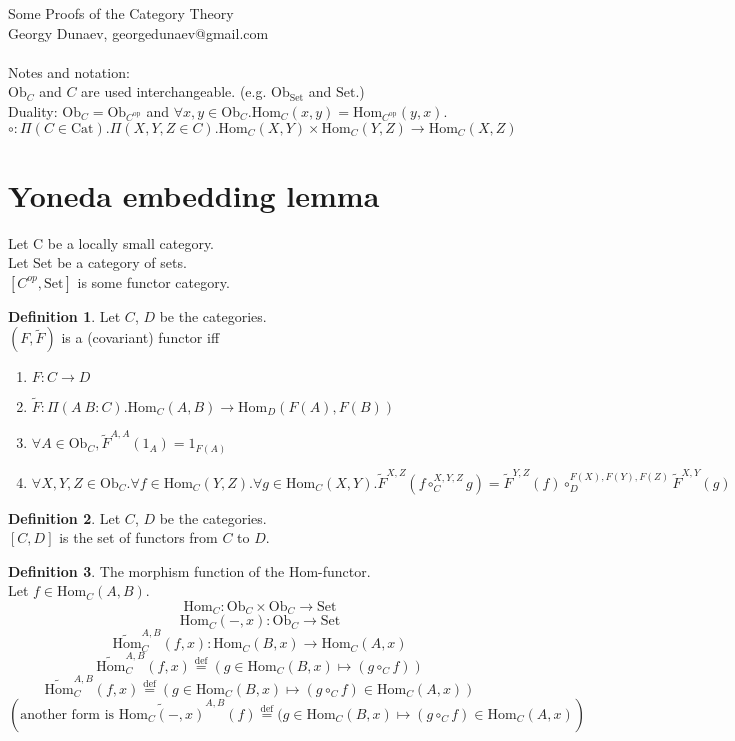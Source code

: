 \documentclass[10pt,a4paper]{article}
\theoremstyle{definition}
\newtheorem{definition}{Definition}[section]
\newcommand{\Ob}{{\mbox{Ob}}}
\newcommand{\Cat}{{\mbox{Cat}}}
\newcommand{\Hom}{{\mbox{Hom}}}
\newcommand{\HomMor}{{\widetilde{\Hom}\mbox{}}}
\newcommand{\FMor}{{\widetilde{F}\mbox{}}}
\newcommand{\op}{{\mbox{op}}}
\newcommand{\defi}{{\mbox{def}}}
\newcommand{\eqdef}{{\stackrel{\defi}{=}}}
\newcommand{\Set}{{\mbox{Set}}}
\begin{document}
Some Proofs of the Category Theory\\
Georgy Dunaev, georgedunaev@gmail.com\\
\\
Notes and notation:\\
$\Ob_C$ and $C$ are used interchangeable. (e.g. $\Ob_\Set$ and $\Set$.)\\
Duality: $\Ob_C = \Ob_{C^\op}$ and 
 $\forall x,y \in \Ob_C. \Hom_C(x,y) = \Hom_{C^\op}(y,x)$.\\
$\circ : \Pi(C\in \Cat).\Pi(X,Y,Z\in C).\Hom_C(X,Y)\times\Hom_C(Y,Z)\to\Hom_C(X,Z)$

\section{Yoneda embedding lemma}
Let C be a locally small category.\\
Let Set be a category of sets.\\
$[C^{op},\mbox{Set}]$ is some functor category.\\

\begin{definition}
Let $C$, $D$ be the categories.\\
 $(F, \FMor)$ is a (covariant) functor iff\\
\begin{enumerate}
\item $F:C \to D$
\item $\FMor:\Pi(A\ B:C).\Hom_C(A,B) \to \Hom_D(F(A), F(B))$
\item $\forall A\in \Ob_C, \FMor^{A,A}(1_A)=1_{F(A)}$
\item $\forall X,Y,Z \in \Ob_C.\forall f\in\Hom_C(Y,Z).\forall g\in\Hom_C(X,Y). \FMor^{X,Z}(f\circ_C^{X,Y,Z} g)=\FMor^{Y,Z}(f)\circ_D^{F(X),F(Y),F(Z)} \FMor^{X,Y}(g)$
\end{enumerate}

\end{definition}

\begin{definition}
Let $C$, $D$ be the categories.\\
$[C,D]$ is the set of functors from $C$ to $D$.\\
\end{definition}

\begin{definition} The morphism function of the Hom-functor.\\
Let $f\in\Hom_{C}(A,B)$.
$$\Hom_C: \Ob_C \times \Ob_C \to \Set$$
$$\Hom_C(-,x): \Ob_C \to \Set$$
$$\HomMor^{A,B}_C(f,x) : \Hom_C(B,x) \to \Hom_C(A,x)$$
$$\HomMor^{A,B}_C(f,x) \eqdef (g \in\Hom_C(B,x) \mapsto (g \circ_C f))$$
$$\HomMor^{A,B}_C(f,x) \eqdef (g \in\Hom_C(B,x) \mapsto (g \circ_C f) \in\Hom_C(A,x))$$
$$\left(\mbox{another form is }\widetilde{\Hom_C(-,x)}^{A,B}(f) \eqdef (g \in\Hom_C(B,x) \mapsto (g \circ_C f) \in\Hom_C(A,x)\right)$$
\end{definition}
\end{document}
